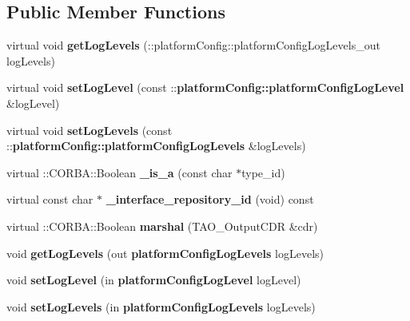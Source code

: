 \subsection*{Public Member Functions}
\begin{DoxyCompactItemize}
\item 
virtual void {\bfseries get\+Log\+Levels} (\+::platform\+Config\+::platform\+Config\+Log\+Levels\+\_\+out log\+Levels)\label{classplatformConfig_1_1platformConfig__I_a72ce1fac08a59e78a3d2e6fc73be7f80}

\item 
virtual void {\bfseries set\+Log\+Level} (const \+::{\bf platform\+Config\+::platform\+Config\+Log\+Level} \&log\+Level)\label{classplatformConfig_1_1platformConfig__I_aec51727ab9f488a8b6272443f62999d1}

\item 
virtual void {\bfseries set\+Log\+Levels} (const \+::{\bf platform\+Config\+::platform\+Config\+Log\+Levels} \&log\+Levels)\label{classplatformConfig_1_1platformConfig__I_a846c3e4da4d8cbdaeee56cc9ec64c6ab}

\item 
virtual \+::C\+O\+R\+B\+A\+::\+Boolean {\bfseries \+\_\+is\+\_\+a} (const char $\ast$type\+\_\+id)\label{classplatformConfig_1_1platformConfig__I_ab5f5f8842ebb2d9ca15fce025719fe66}

\item 
virtual const char $\ast$ {\bfseries \+\_\+interface\+\_\+repository\+\_\+id} (void) const \label{classplatformConfig_1_1platformConfig__I_ab232f847e94af5955a2fa213c83e812e}

\item 
virtual \+::C\+O\+R\+B\+A\+::\+Boolean {\bfseries marshal} (T\+A\+O\+\_\+\+Output\+C\+DR \&cdr)\label{classplatformConfig_1_1platformConfig__I_a6de26392358c6d0078be8d56f84aeebc}

\item 
void {\bf get\+Log\+Levels} (out {\bf platform\+Config\+Log\+Levels} log\+Levels)
\item 
void {\bf set\+Log\+Level} (in {\bf platform\+Config\+Log\+Level} log\+Level)
\item 
void {\bf set\+Log\+Levels} (in {\bf platform\+Config\+Log\+Levels} log\+Levels)
\end{DoxyCompactItemize}
